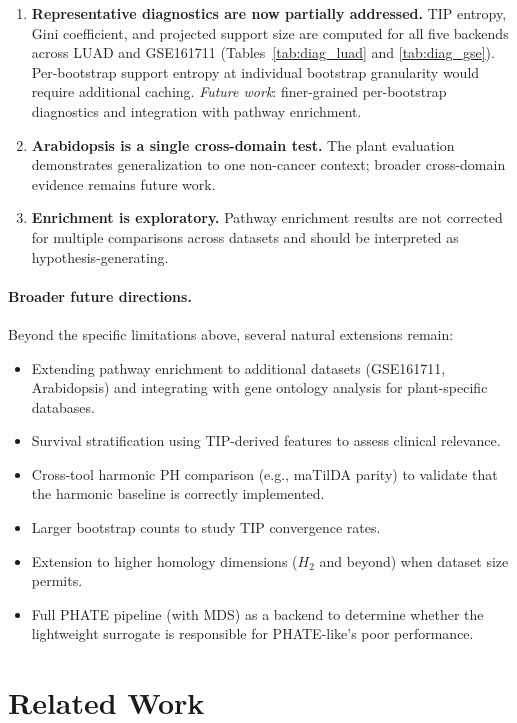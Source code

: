 \documentclass[11pt]{article}
\begin{document}
\begin{enumerate}[leftmargin=1.5em]
\item \textbf{Representative diagnostics are now partially addressed.}
TIP entropy, Gini coefficient, and projected support size are computed for all five backends across LUAD and GSE161711 (Tables~\ref{tab:diag_luad} and \ref{tab:diag_gse}).
Per-bootstrap support entropy at individual bootstrap granularity would require additional caching.
\emph{Future work}: finer-grained per-bootstrap diagnostics and integration with pathway enrichment.

\item \textbf{Arabidopsis is a single cross-domain test.}
The plant evaluation demonstrates generalization to one non-cancer context; broader cross-domain evidence remains future work.

\item \textbf{Enrichment is exploratory.}
Pathway enrichment results are not corrected for multiple comparisons across datasets and should be interpreted as hypothesis-generating.
\end{enumerate}

\paragraph{Broader future directions.}
Beyond the specific limitations above, several natural extensions remain:
\begin{itemize}[leftmargin=1.5em]
\item Extending pathway enrichment to additional datasets (GSE161711, Arabidopsis) and integrating with gene ontology analysis for plant-specific databases.
\item Survival stratification using TIP-derived features to assess clinical relevance.
\item Cross-tool harmonic PH comparison (e.g., maTilDA parity) to validate that the harmonic baseline is correctly implemented.
\item Larger bootstrap counts to study TIP convergence rates.
\item Extension to higher homology dimensions ($H_2$ and beyond) when dataset size permits.
\item Full PHATE pipeline (with MDS) as a backend to determine whether the lightweight surrogate is responsible for PHATE-like's poor performance.
\end{itemize}

\section{Related Work}
\label{sec:related}
\end{document}
